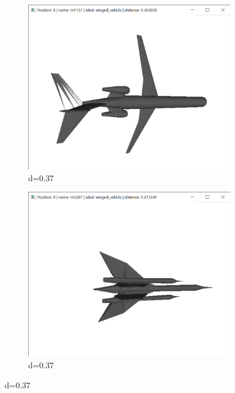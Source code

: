 \documentclass{bigdata}
\begin{document}
\begin{figure}[h!]
\begin{subfigure}[b]{0.09\linewidth}
    \includegraphics[width=\linewidth]{Pictures/Evaluation/m42/pos8.png}
    \caption*{d=0.37}
  \end{subfigure}
  \begin{subfigure}[b]{0.09\linewidth}
    \includegraphics[width=\linewidth]{Pictures/Evaluation/m42/pos9.png}
    \caption*{d=0.37}
  \end{subfigure}


\end{figure}
\end{document}

